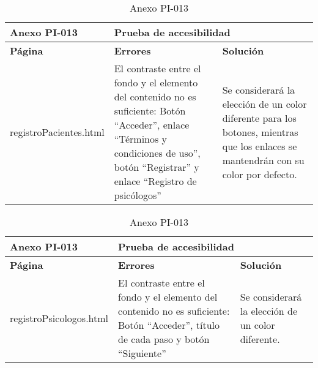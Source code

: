 \begin{table}[htpb]
\centering
\begin{tabularx}{\textwidth}{|l|X|X|}
\hline
\textbf{Anexo PI-013}  & \multicolumn{2}{l|}{\textbf{Prueba de accesibilidad}}                                                                                                                                                                                                                                                                \\ \hline
\textbf{Página}        & \textbf{Errores}                                                                                                                                                               & \textbf{Solución}                                                                                                                   \\ \hline
registroPacientes.html & El contraste entre el fondo y el elemento del contenido no es suficiente: Botón “Acceder”, enlace “Términos y condiciones de uso”, botón “Registrar” y enlace “Registro de psicólogos” & Se considerará la elección de un color diferente para los botones, mientras que los enlaces se mantendrán con su color por defecto. \\ \hline
\end{tabularx}
\caption{Anexo PI-013}
\end{table}


\begin{table}[htpb]
\centering
\begin{tabularx}{\textwidth}{|l|X|X|}
\hline
\textbf{Anexo PI-013}   & \multicolumn{2}{l|}{\textbf{Prueba de accesibilidad}}                                                                                                                            \\ \hline
\textbf{Página}         & \textbf{Errores}                                                                                                             & \textbf{Solución}                                 \\ \hline
registroPsicologos.html & El contraste entre el fondo y el elemento del contenido no es suficiente: Botón “Acceder”, título de cada paso y botón “Siguiente” & Se considerará la elección de un color diferente. \\ \hline
\end{tabularx}
\caption{Anexo PI-013}
\end{table}


